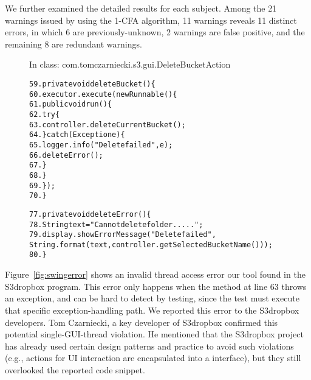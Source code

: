 We further examined the detailed results for each subject.
Among the 21 warnings issued by using the 1-CFA algorithm, 11
warnings reveals 11 distinct errors, in which 6 are previously-unknown,
2 warnings are false positive, and the remaining 8 
are redundant warnings.




\begin{figure}[t]
\hspace{4mm}\small{In class: com.tomczarniecki.s3.gui.DeleteBucketAction}
\vspace{-2mm}
\begin{CodeOut}
\begin{alltt}
59.private void deleteBucket() \{
60.    executor.execute(new Runnable() \{
61.        public void run() \{
62.            try \{
63.                controller.deleteCurrentBucket();
64.            \} catch (Exception e) \{
65.                logger.info("Delete failed", e);
66.                deleteError(); 
67.            \}
68.       \}
69.    \});
70.\}

77.private void deleteError() \{
78.    String text = "Cannot delete folder .....";
79.    display.showErrorMessage("Delete failed", 
        String.format(text, controller.getSelectedBucketName())); 
80.\}
\end{alltt}
\end{CodeOut}
\vspace*{-2.0ex}  %
\end{figure}

Figure~\ref{fig:swingerror}
shows an invalid thread access error our tool found in the S3dropbox
program. This error only happens when the 
method at line 63 throws an exception, and can be hard to
detect by testing, since the test must  execute that specific exception-handling
path. We reported this error to the S3dropbox developers. Tom Czarniecki,
a key developer of S3dropbox confirmed this potential single-GUI-thread
violation. He mentioned that the S3dropbox project has already
used certain design patterns and practice to avoid such violations (e.g.,
actions for UI interaction are encapsulated into a  interface),
but they still overlooked  the reported code snippet. 

